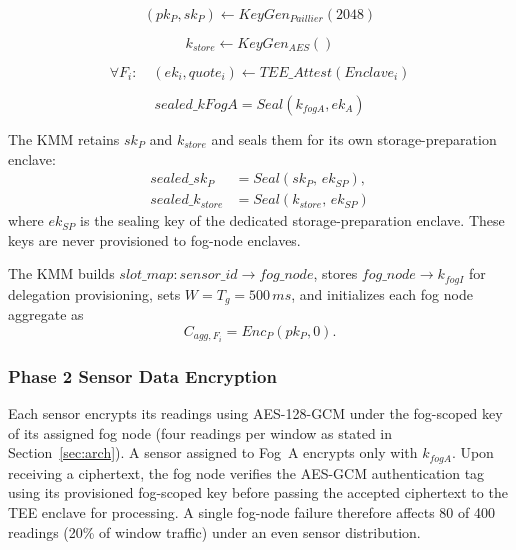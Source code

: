 \documentclass[conference]{IEEEtran}
\begin{document}
    \begin{equation}
    (pk_P, sk_P) \leftarrow KeyGen_{Paillier}(2048)
    \end{equation}

    \begin{equation}
    k_{store} \leftarrow KeyGen_{AES}()
    \end{equation}

    \begin{equation}
    \forall F_i:\quad (ek_i, quote_i) \leftarrow TEE\_Attest(Enclave_i)
    \end{equation}

    \begin{equation}
    sealed\_kFogA = Seal(k_{fogA}, ek_A)
    \end{equation}

    The KMM retains $sk_P$ and $k_{store}$ and seals them for its own storage-preparation enclave:
    \begin{equation}
    \begin{aligned}
    sealed\_sk_P &= Seal(sk_P,\, ek_{SP}),\\
    sealed\_k_{store} &= Seal(k_{store},\, ek_{SP})
    \end{aligned}
    \end{equation}
    where $ek_{SP}$ is the sealing key of the dedicated storage-preparation enclave. These keys are never provisioned to fog-node enclaves.

    The KMM builds $slot\_map:sensor\_id\rightarrow fog\_node$, stores $fog\_node\rightarrow k_{fogI}$ for delegation provisioning, sets $W=T_g=500\,ms$, and initializes each fog node aggregate as
    \begin{equation}
    C_{agg,F_i} = Enc_P(pk_P,0).
    \end{equation}

    \subsubsection{\textbf{Phase 2 Sensor Data Encryption}}

    Each sensor encrypts its readings using AES-128-GCM under the fog-scoped key of its assigned fog node (four readings per window as stated in Section~\ref{sec:arch}). A sensor assigned to Fog~A encrypts only with $k_{fogA}$. Upon receiving a ciphertext, the fog node verifies the AES-GCM authentication tag using its provisioned fog-scoped key before passing the accepted ciphertext to the TEE enclave for processing. A single fog-node failure therefore affects 80 of 400 readings (20\% of window traffic) under an even sensor distribution.
\end{document}
